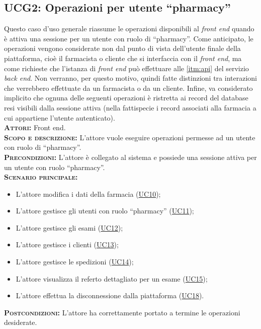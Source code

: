 \subsection{UCG2: Operazioni per utente ``pharmacy''}
\label{sec:UCG2}
Questo caso d'uso generale riassume le operazioni disponibili al \textit{front end} quando è attiva una sessione per un utente con ruolo di ``pharmacy''. Come anticipato, le operazioni vengono considerate non dal punto di vista dell'utente finale della piattaforma, cioè il farmacista o cliente che si interfaccia con il \textit{front end}, ma come richieste che l'istanza di \textit{front end} può effettuare alle \ref{itm:api} del servizio \textit{back end}. Non verranno, per questo motivo, quindi fatte distinzioni tra interazioni che verrebbero effettuate da un farmacista o da un cliente. Infine, va considerato implicito che ognuna delle seguenti operazioni è ristretta ai record del database resi visibili dalla sessione attiva (nella fattispecie i record associati alla farmacia a cui appartiene l'utente autenticato).\\
\textsc{\textbf{Attori:}} Front end.\\
\textsc{\textbf{Scopo e descrizione:}} L'attore vuole eseguire operazioni permesse ad un utente con ruolo di ``pharmacy''.\\
\textsc{\textsc{\textbf{Precondizioni:}}} L'attore è collegato al sistema e possiede una sessione attiva per un utente con ruolo ``pharmacy''.\\
\textsc{\textbf{Scenario principale:}} 
\begin{itemize}
    \item L'attore modifica i dati della farmacia (\hyperref[sec:UC10]{UC10});
    \item L'attore gestisce gli utenti con ruolo ``pharmacy'' (\hyperref[sec:UC11]{UC11});
    \item L'attore gestisce gli esami (\hyperref[sec:UC12]{UC12});
    \item L'attore gestisce i clienti (\hyperref[sec:UC13]{UC13});
    \item L'attore gestisce le spedizioni (\hyperref[sec:UC14]{UC14});
    \item L'attore visualizza il referto dettagliato per un esame (\hyperref[sec:UC15]{UC15});
    \item L'attore effettua la disconnessione dalla piattaforma (\hyperref[sec:UC18]{UC18}).
\end{itemize}
\textsc{\textbf{Postcondizioni:}} L'attore ha correttamente portato a termine le operazioni desiderate.

